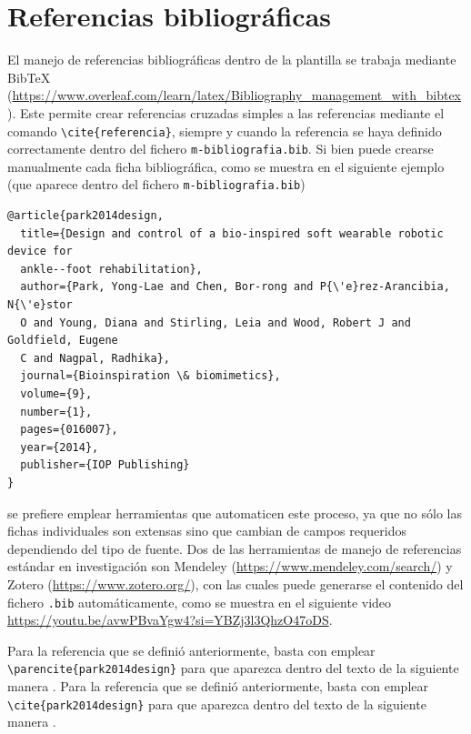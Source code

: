 \section{Referencias bibliográficas}

El manejo de referencias bibliográficas dentro de la plantilla se trabaja mediante BibTeX (\href{https://www.overleaf.com/learn/latex/Bibliography_management_with_bibtex}{https://www.overleaf.com/learn/latex/Bibliography\_management\_with\_bibtex}). Este permite crear referencias cruzadas simples a las referencias mediante el comando \verb|\cite{referencia}|, siempre y cuando la referencia se haya definido correctamente dentro del fichero \verb|m-bibliografia.bib|. Si bien puede crearse manualmente cada ficha bibliográfica, como se muestra en el siguiente ejemplo (que aparece dentro del fichero \verb|m-bibliografia.bib|) 

\begin{verbatim}
@article{park2014design,
  title={Design and control of a bio-inspired soft wearable robotic device for 
  ankle--foot rehabilitation},
  author={Park, Yong-Lae and Chen, Bor-rong and P{\'e}rez-Arancibia, N{\'e}stor 
  O and Young, Diana and Stirling, Leia and Wood, Robert J and Goldfield, Eugene 
  C and Nagpal, Radhika},
  journal={Bioinspiration \& biomimetics},
  volume={9},
  number={1},
  pages={016007},
  year={2014},
  publisher={IOP Publishing}
}
\end{verbatim}

se prefiere emplear herramientas que automaticen este proceso, ya que no sólo las fichas individuales son extensas sino que cambian de campos requeridos dependiendo del tipo de fuente. Dos de las herramientas de manejo de referencias estándar en investigación son Mendeley (\href{https://www.mendeley.com/search/}{https://www.mendeley.com/search/}) y Zotero (\href{https://www.zotero.org/}{https://www.zotero.org/}), con las cuales puede generarse el contenido del fichero \texttt{.bib} automáticamente, como se muestra en el siguiente video \href{https://youtu.be/avwPBvaYgw4?si=YBZj3l3QhzO47oDS}{https://youtu.be/avwPBvaYgw4?si=YBZj3l3QhzO47oDS}.
 
\ifdefined\usarAPA
    Para la referencia que se definió anteriormente, basta con emplear \verb|\parencite{park2014design}| para que aparezca dentro del texto de la siguiente manera \parencite{park2014design}.
\else
    Para la referencia que se definió anteriormente, basta con emplear \verb|\cite{park2014design}| para que aparezca dentro del texto de la siguiente manera \cite{park2014design}.
\fi

